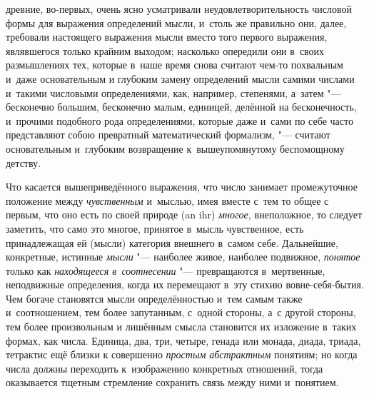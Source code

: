 древние, во-первых, очень ясно усматривали неудовлетворительность числовой
формы для выражения определений мысли, и~столь же правильно они, далее,
требовали настоящего выражения мысли вместо того первого выражения, являвшегося
только крайним выходом; насколько опередили они в~своих размышлениях тех,
которые в~наше время снова считают чем-то похвальным и~даже основательным и
глубоким замену определений мысли самими числами и~такими числовыми
определениями, как, например, степенями, а~затем "--- бесконечно большим,
бесконечно малым, единицей, делённой на бесконечность, и~прочими подобного рода
определениями, которые даже и~сами по себе часто представляют собою
превратный математический формализм, "--- считают основательным и~глубоким
возвращение к~вышеупомянутому беспомощному детству.

Что касается вышеприведённого выражения, что число занимает промежуточное
положение между {\em чувственным} и~мыслью, имея вместе с~тем то общее с
первым, что оно есть по своей природе (an ihr) {\em многое,} внеположное, то
следует заметить, что само это многое, принятое в~мысль чувственное, есть
принадлежащая ей (мысли) категория внешнего в~самом себе. Дальнейшие,
конкретные, истинные {\em мысли} "--- наиболее живое, наиболее
подвижное, {\em понятое} только как {\em находящееся в~соотнесении} "--- превращаются в~мертвенные,
неподвижные определения, когда их перемещают в~эту стихию вовне-себя-бытия. Чем
богаче становятся мысли определённостью и~тем самым также и~соотношением, тем
более запутанным, с~одной стороны, а~с другой стороны, тем более произвольным и
лишённым смысла становится их изложение в~таких формах, как числа. Единица,
два, три, четыре, генада или монада, диада, триада, тетрактис ещё близки к
совершенно {\em простым абстрактным} понятиям; но когда числа должны
переходить к~изображению конкретных отношений, тогда оказывается тщетным
стремление сохранить связь между ними и~понятием.

